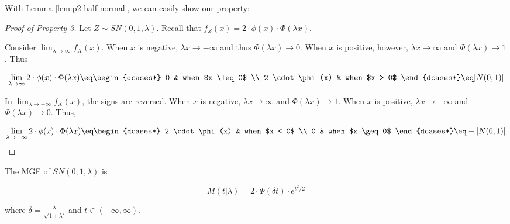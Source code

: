 \documentclass{article}
\begin{document}
With Lemma \ref{lem:p2-half-normal}, we can easily show our property:

\begin{proof}[Proof of Property 3]
  Let $Z \sim SN(0,1,\lambda)$. Recall that $f_Z(x) = 2 \cdot \phi(x) \cdot
  \Phi(\lambda x)$.

  Consider $\lim_{\lambda \to \infty} f_X(x)$. When $x$ is negative, $\lambda x
  \to -\infty$ and thus $\Phi(\lambda x) \to 0$. When $x$ is positive, however,
  $\lambda x \to \infty$ and $\Phi(\lambda x) \to 1$. Thus

  \begin{equation}
    \label{eq:p2-positive-half-normal}
    \lim_{\lambda \to \infty} 2 \cdot \phi(x) \cdot \Phi(\lambda x) \eq
    \begin{dcases*}
      0 & when $x \leq 0$ \\
      2 \cdot \phi(x) & when $x > 0$
    \end{dcases*}
    \eq |N(0,1)|
  \end{equation}

  In $\lim_{\lambda \to -\infty} f_X(x)$, the signs are reversed. When $x$ is
  negative, $\lambda x \to \infty$ and $\Phi(\lambda x) \to 1$. When $x$ is
  positive, $\lambda x \to -\infty$ and $\Phi(\lambda x) \to 0$. Thus,

  \begin{equation}
    \label{eq:p2-negative-half-normal}
    \lim_{\lambda \to -\infty} 2 \cdot \phi(x) \cdot \Phi(\lambda x) \eq
    \begin{dcases*}
      2 \cdot \phi(x) & when $x < 0$ \\
      0 & when $x \geq 0$
    \end{dcases*}
    \eq -|N(0,1)|
  \end{equation}
\end{proof}


\begin{property} \label{prop:4}
  The MGF of $SN(0,1,\lambda)$ is

  \begin{equation} \label{eq:p4-sn-mgf}
    M(t|\lambda) = 2 \cdot \Phi (\delta t) \cdot e^{t^2/2}
  \end{equation}
    
  where $\delta = \frac{\lambda}{\sqrt{1 + \lambda^2}}$ and $t \in (-\infty, \infty)$.
\end{property}
\end{document}
